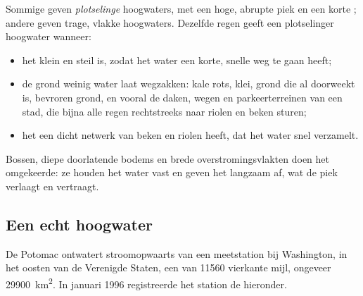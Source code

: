 Sommige  geven \emph{plotselinge} hoogwaters, met een hoge,
abrupte piek en een korte ; andere geven trage, vlakke
hoogwaters. Dezelfde regen geeft een plotselinger hoogwater wanneer:
\begin{itemize}
  \item het  klein en steil is, zodat het water een korte, snelle
        weg te gaan heeft;
  \item de grond weinig water laat wegzakken: kale rots, klei, grond die al
        doorweekt is, bevroren grond, en vooral de daken, wegen en parkeerterreinen
        van een stad, die bijna alle regen rechtstreeks naar riolen en beken
        sturen;
  \item het  een dicht netwerk van beken en riolen heeft, dat het
        water snel verzamelt.
\end{itemize}
Bossen, diepe doorlatende bodems en brede overstromingsvlakten doen het
omgekeerde: ze houden het water vast en geven het langzaam af, wat de piek
verlaagt en vertraagt.

\subsection*{Een echt hoogwater}

De Potomac ontwatert stroomopwaarts van een meetstation bij Washington, in het
oosten van de Verenigde Staten, een  van \num{11560} vierkante mijl,
ongeveer \qty{29900}{km^2}. In januari 1996 registreerde het station de
 hieronder.

